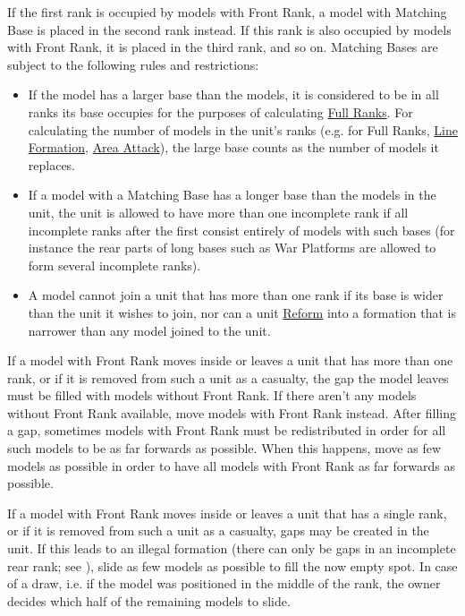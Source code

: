 If the first rank is occupied by models with Front Rank, a model with Matching Base is placed in the second rank instead. If this rank is also occupied by models with Front Rank, it is placed in the third rank, and so on. Matching Bases are subject to the following rules and restrictions:
\begin{itemize}
\item If the model has a larger base than the \rnf{} models, it is considered to be in all ranks its base occupies for the purposes of calculating \hyperref[full_ranks]{Full Ranks}. For calculating the number of models in the unit's ranks (e.g. for Full Ranks, \hyperref[line_formation]{Line Formation}, \hyperref[area_attack]{Area Attack}), the large base counts as the number of models it replaces.
\item If a model with a Matching Base has a longer base than the \rnf{} models in the unit, the unit is allowed to have more than one incomplete rank if all incomplete ranks after the first consist entirely of models with such bases (for instance the rear parts of long bases such as War Platforms are allowed to form several incomplete ranks).
\item A model cannot join a unit that has more than one rank if its base is wider than the unit it wishes to join, nor can a unit \hyperref[reform]{Reform} into a formation that is narrower than any model joined to the unit.
\end{itemize}

If a model with Front Rank moves inside or leaves a unit that has more than one rank, or if it is removed from such a unit as a casualty, the gap the model leaves must be filled with models without Front Rank. If there aren't any models without Front Rank available, move models with Front Rank instead. After filling a gap, sometimes models with Front Rank must be redistributed in order for all such models to be as far forwards as possible. When this happens, move as few models as possible in order to have all models with Front Rank as far forwards as possible.

If a model with Front Rank moves inside or leaves a unit that has a single rank, or if it is removed from such a unit as a casualty, gaps may be created in the unit. If this leads to an illegal formation (there can only be gaps in an incomplete rear rank; see ), slide as few models as possible to fill the now empty spot. In case of a draw, i.e. if the model was positioned in the middle of the rank, the owner decides which half of the remaining models to slide.

